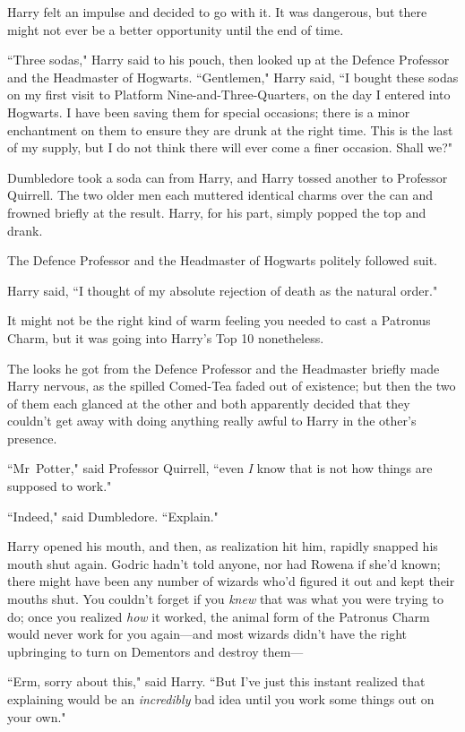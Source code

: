 Harry felt an impulse and decided to go with it. It was dangerous, but there might not ever be a better opportunity until the end of time.

``Three sodas," Harry said to his pouch, then looked up at the Defence Professor and the Headmaster of Hogwarts. ``Gentlemen," Harry said, ``I bought these sodas on my first visit to Platform Nine-and-Three-Quarters, on the day I entered into Hogwarts. I have been saving them for special occasions; there is a minor enchantment on them to ensure they are drunk at the right time. This is the last of my supply, but I do not think there will ever come a finer occasion. Shall we?"

Dumbledore took a soda can from Harry, and Harry tossed another to Professor Quirrell. The two older men each muttered identical charms over the can and frowned briefly at the result. Harry, for his part, simply popped the top and drank.

The Defence Professor and the Headmaster of Hogwarts politely followed suit.

Harry said, ``I thought of my absolute rejection of death as the natural order."

It might not be the right kind of warm feeling you needed to cast a Patronus Charm, but it was going into Harry's Top 10 nonetheless.

The looks he got from the Defence Professor and the Headmaster briefly made Harry nervous, as the spilled Comed-Tea faded out of existence; but then the two of them each glanced at the other and both apparently decided that they couldn't get away with doing anything really awful to Harry in the other's presence.

``Mr~Potter," said Professor Quirrell, ``even \emph{I} know that is not how things are supposed to work."

``Indeed," said Dumbledore. ``Explain."

Harry opened his mouth, and then, as realization hit him, rapidly snapped his mouth shut again. Godric hadn't told anyone, nor had Rowena if she'd known; there might have been any number of wizards who'd figured it out and kept their mouths shut. You couldn't forget if you \emph{knew} that was what you were trying to do; once you realized \emph{how} it worked, the animal form of the Patronus Charm would never work for you again—and most wizards didn't have the right upbringing to turn on Dementors and destroy them—

``Erm, sorry about this," said Harry. ``But I've just this instant realized that explaining would be an \emph{incredibly} bad idea until you work some things out on your own."

